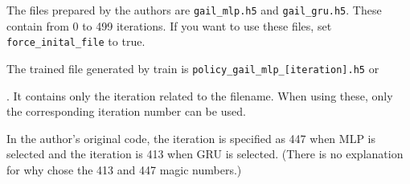 \documentclass[openany,11pt]{report}%
\begin{document}
The files prepared by the authors are {\tt gail\_mlp.h5} and {\tt gail\_gru.h5}. These contain from 0 to 499 iterations. If you want to use these files, set {\tt force\_inital\_file} to true.

The trained file generated by train is {\tt policy\_gail\_mlp\_[iteration].h5} or 

\hspace{-6mm}{\tt policy\_gil\_gru\_[iteration].h5}.
It contains only the iteration related to the filename. When using these, only the corresponding iteration number can be used.

In the author's original code, the iteration is specified as 447 when MLP is selected and the iteration is 413 when GRU is selected. (There is no explanation for why chose the 413 and 447 magic numbers.)
\end{document}
